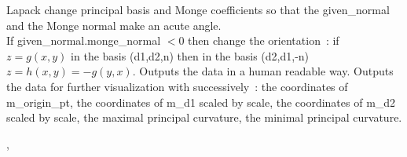 \begin{ccRefClass}{Lapack}
\ccOperations
{ change principal basis and Monge coefficients so that the
given\_normal and the Monge normal make an acute angle.\\ If
given\_normal.monge\_normal $< 0$ then change the orientation~: if
$z=g(x,y)$ in the basis (d1,d2,n) then in the basis (d2,d1,-n)
$z=h(x,y)=-g(y,x)$. }
{ Outputs the data in a human readable way.}
{ Outputs the data for further visualization with successively~: the
coordinates of m\_origin\_pt, the coordinates of m\_d1 scaled by scale,
the coordinates of m\_d2 scaled by scale, the maximal principal
curvature, the minimal principal curvature.}

\ccSeeAlso

,





\end{ccRefClass}


